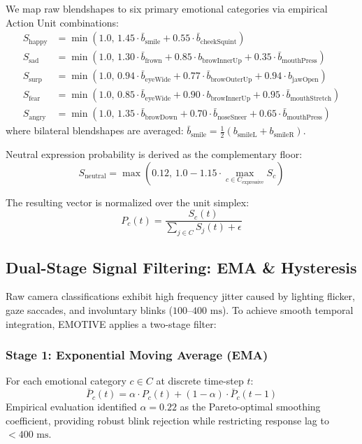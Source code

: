 \documentclass[sigconf,nonacm]{acmart}
\begin{document}
We map raw blendshapes to six primary emotional categories via empirical Action Unit combinations:
\begin{align}
S_{\text{happy}} &= \min(1.0, \, 1.45 \cdot \bar{b}_{\text{smile}} + 0.55 \cdot \bar{b}_{\text{cheekSquint}}) \\
S_{\text{sad}} &= \min(1.0, \, 1.30 \cdot \bar{b}_{\text{frown}} + 0.85 \cdot b_{\text{browInnerUp}} + 0.35 \cdot \bar{b}_{\text{mouthPress}}) \\
S_{\text{surp}} &= \min(1.0, \, 0.94 \cdot \bar{b}_{\text{eyeWide}} + 0.77 \cdot \bar{b}_{\text{browOuterUp}} + 0.94 \cdot b_{\text{jawOpen}}) \\
S_{\text{fear}} &= \min(1.0, \, 0.85 \cdot \bar{b}_{\text{eyeWide}} + 0.90 \cdot b_{\text{browInnerUp}} + 0.95 \cdot \bar{b}_{\text{mouthStretch}}) \\
S_{\text{angry}} &= \min(1.0, \, 1.35 \cdot \bar{b}_{\text{browDown}} + 0.70 \cdot \bar{b}_{\text{noseSneer}} + 0.65 \cdot \bar{b}_{\text{mouthPress}})
\end{align}
where bilateral blendshapes are averaged: $\bar{b}_{\text{smile}} = \frac{1}{2}(b_{\text{smileL}} + b_{\text{smileR}})$.

Neutral expression probability is derived as the complementary floor:
\begin{equation}
S_{\text{neutral}} = \max\left(0.12, \, 1.0 - 1.15 \cdot \max_{c \in C_{\text{expressive}}} S_c\right)
\end{equation}

The resulting vector is normalized over the unit simplex:
\begin{equation}
P_c(t) = \frac{S_c(t)}{\sum_{j \in C} S_j(t) + \epsilon}
\end{equation}

\subsection{Dual-Stage Signal Filtering: EMA \& Hysteresis}

Raw camera classifications exhibit high frequency jitter caused by lighting flicker, gaze saccades, and involuntary blinks ($100\text{--}400\text{ ms}$). To achieve smooth temporal integration, EMOTIVE applies a two-stage filter:

\subsubsection{Stage 1: Exponential Moving Average (EMA)}
For each emotional category $c \in C$ at discrete time-step $t$:
\begin{equation}
\bar{P}_c(t) = \alpha \cdot P_c(t) + (1 - \alpha) \cdot \bar{P}_c(t - 1)
\end{equation}
Empirical evaluation identified $\alpha = 0.22$ as the Pareto-optimal smoothing coefficient, providing robust blink rejection while restricting response lag to $< 400\text{ ms}$.
\end{document}
